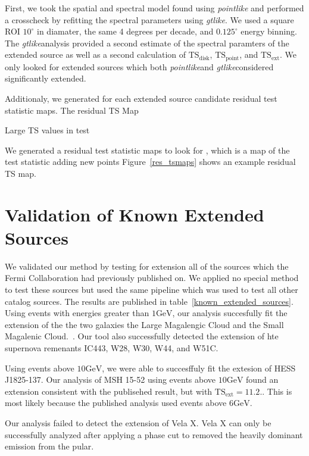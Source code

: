 \documentclass[preprint]{aastex}
\newcommand{\gev}{\text{GeV}}
\newcommand{\tsext}{\ensuremath{\text{TS}_\text{ext}}}
\newcommand{\pointlike}{{\em pointlike}}
\newcommand{\gtlike}{{\em gtlike}}
\begin{document}
First, we took the spatial and spectral model found using \pointlike
and performed a crosscheck by refitting the spectral parameters using 
\gtlike.
We used a square ROI $10^\circ$ in diamater, the same 4 degrees
per decade, and $0.125^\circ$ energy binning.
The \gtlike analysis provided a second estimate of the spectral
paramters of the extended source as well as a second calculation of
$\text{TS}_\text{disk}$, $\text{TS}_\text{point}$, and 
$\tsext$. We only looked for extended sources which 
both \pointlike and \gtlike considered significantly extended.

Additionaly, we generated for each 
extended source candidate residual test statistic maps. 
The residual TS Map

Large
TS values in test 


We generated a residual test statistic maps to look for
, which is a map of the test
statistic adding new points
Figure~\ref{res_tsmaps} shows an example residual TS map.






\section{Validation of Known Extended Sources}
\label{validate_known}

We validated our method by testing for extension all of the sources
which the Fermi Collaboration had previously published on.  We applied
no special method to test these sources but used the same pipeline which
was used to test all other catalog sources.  The results are published
in table~\ref{known_extended_sources}.  Using events with energies
greater than $1\gev$, our analysis succesfully fit the extension of the
the two galaxies the Large Magalengic Cloud and the Small Magalenic
Cloud.~\cite{SMC & LMC Paper}.  Our tool also successfully detected the
extension of hte supernova remenants IC443, W28, W30, W44, and W51C.

Using events above $10\gev$, we were able to succesffuly fit the extesion
of HESS J1825-137\cite{HESS 1825 paper}. Our analysis of MSH 15-52 using
events above $10\gev$ found an extension consistent with the publisehed
result, but with $\tsext=11.2$.\cite{MSH 15-52 Paper}. This
is most likely because the published analysis used events above $6\gev$.

Our analysis failed to detect the extension of Vela X. Vela X can only be
successfully analyzed after applying a phase cut to removed the heavily
dominant emission from the pular.
\end{document}

